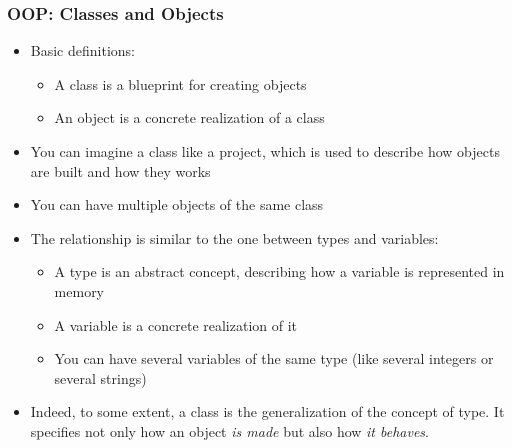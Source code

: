 \documentclass[9pt]{beamer}
\begin{document}
\begin{frame}
  \frametitle{OOP: Classes and Objects}
  
  \begin{itemize}
  \item Basic definitions:
    \begin{itemize}
    \item A \alert{class} is a blueprint for creating objects
    \item An \alert{object} is a concrete realization of a class
    \end{itemize}

  \smallskip
  
  \item You can imagine a class like a project, which is used to
        describe how objects are built and how they works

  \smallskip

  \item You can have multiple objects of the same class
  
  \smallskip
  
  \item The relationship is similar to the one between types and variables:
    \begin{itemize} 
    \item A type is an abstract concept, describing how a variable is
          represented in memory
    \item A variable is a concrete realization of it
    \item You can have several variables of the same type (like several integers
          or several strings)
    \end{itemize}
  
  \smallskip
  
  \item Indeed, to some extent, a class is the generalization of the concept of
        type. It specifies not only how an object \emph{is made} but also how \emph{it behaves}.
  \end{itemize}

\end{frame}
\end{document}
